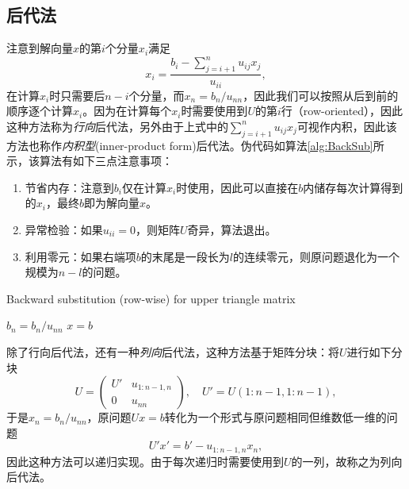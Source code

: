 \documentclass[a4paper,10pt]{ctexart}
\begin{document}
\subsection{后代法}
注意到解向量$ x $的第$ i $个分量$ x_i $满足
\[
    x_i = \frac{b_i - \sum_{j=i+1}^{n} u_{ij}x_j}{u_{ii}},
\]
在计算$ x_i $时只需要后$ n-i $个分量，而$ x_n = b_n / u_{nn} $，因此我们可以按照从后到前的顺序逐个计算$ x_i $。因为在计算每个$ x_i $时需要使用到$ U $的第$ i $行（row-oriented），因此这种方法称为\emph{行向}后代法，另外由于上式中的$ \sum_{j=i+1}^{n} u_{ij}x_j $可视作内积，因此该方法也称作\emph{内积型}(inner-product form)后代法。伪代码如算法\ref{alg:BackSub}所示，该算法有如下三点注意事项：
\begin{enumerate}
    \item 节省内存：注意到$ b_i $仅在计算$ x_i $时使用，因此可以直接在$ b $内储存每次计算得到的$ x_i $，最终$ b $即为解向量$ x $。
    \item 异常检验：如果$ u_{ii} = 0 $，则矩阵$ U $奇异，算法退出。
    \item 利用零元：如果右端项$ b $的末尾是一段长为$ l $的连续零元，则原问题退化为一个规模为$ n-l $的问题。
\end{enumerate}

\begin{algorithm}[htbp]
    \caption{Backward substitution (row-wise) for upper triangle matrix}\label{alg:BackSub}
    $ b_n = b_n/u_{nn} $\;
    \Return $ x=b $\;
\end{algorithm}

除了行向后代法，还有一种\emph{列向}后代法，这种方法基于矩阵分块：将$ U $进行如下分块
\[
    U = 
    \begin{pmatrix}
        U' & u_{1:n-1,n}\\
        0 & u_{nn}
    \end{pmatrix},\quad
    U' = U(1:n-1,1:n-1),
\]
于是$ x_n = b_n / u_{nn} $，原问题$ Ux=b $转化为一个形式与原问题相同但维数低一维的问题
\[
    U'x' = b' - u_{1:n-1,n}x_n,
\]
因此这种方法可以递归实现。由于每次递归时需要使用到$ U $的一列，故称之为列向后代法。
\end{document}
